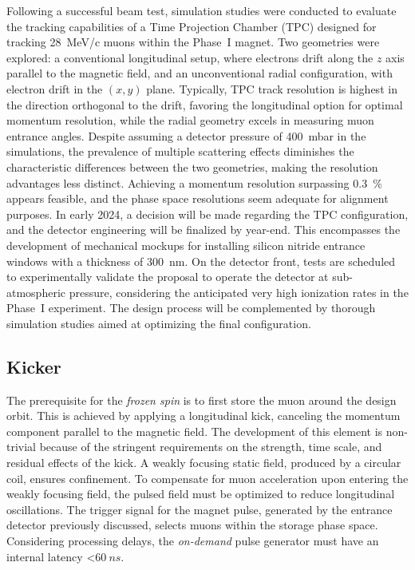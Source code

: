 \begin{refsection}
        \noindent
        Following a successful beam test, simulation studies were conducted to evaluate the tracking capabilities of a Time Projection Chamber (TPC) designed for tracking \SI{28}{MeV/c} muons within the Phase~I magnet. 
        Two geometries were explored: a conventional longitudinal setup, where electrons drift along the $z$ axis parallel to the magnetic field, and an unconventional radial configuration, with electron drift in the $(x,y)$ plane. 
        Typically, TPC track resolution is highest in the direction orthogonal to the drift, favoring the longitudinal option for optimal momentum resolution, while the radial geometry excels in measuring muon entrance angles. 
        Despite assuming a detector pressure of \SI{400}{\milli\bar} in the simulations, the prevalence of multiple scattering effects diminishes the characteristic differences between the two geometries, making the resolution advantages less distinct.
        Achieving a momentum resolution surpassing \SI{0.3}{\percent} appears feasible, and the phase space resolutions seem adequate for alignment purposes. 
        In early 2024, a decision will be made regarding the TPC configuration, and the detector engineering will be finalized by year-end. 
        This encompasses the development of mechanical mockups for installing silicon nitride entrance windows with a thickness of \SI{300}{\nano\meter}. 
        On the detector front, tests are scheduled to experimentally validate the proposal to operate the detector at sub-atmospheric pressure, considering the anticipated very high ionization rates in the Phase~I experiment. 
        The design process will be complemented by thorough simulation studies aimed at optimizing the final configuration.
        
    \subsection{Kicker}
    \label{sec:muEDM:kicker}
        The prerequisite for the \textit{frozen spin} is to first store the muon around the design orbit.
        This is achieved by applying a longitudinal kick, canceling the momentum component parallel to the magnetic field.
        The development of this element is non-trivial because of the stringent requirements on the strength, time scale, and residual effects of the kick.
        A weakly focusing static field, produced by a circular coil, ensures confinement. 
        To compensate for muon acceleration upon entering the weakly focusing field, the pulsed field must be optimized to reduce longitudinal oscillations.
        The trigger signal for the magnet pulse, generated by the entrance detector previously discussed, selects muons within the storage phase space. 
        Considering processing delays, the \textit{on-demand} pulse generator must have an internal latency <$\SI{60}{ns}$.
        

\end{refsection}
